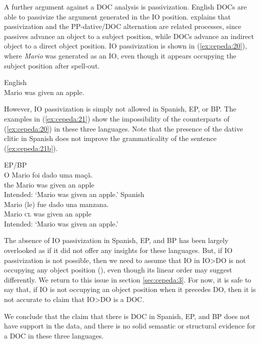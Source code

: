 \documentclass[output=paper,colorlinks,citecolor=brown,nonflat]{./langscibook}
\begin{document}
A further argument against a DOC analysis is passivization. English DOCs are able to passivize the argument generated in the IO position. \citet{Larson1988} explains that passivization and the PP-dative/DOC alternation are related processes, since passives advance an object to a subject position, while DOCs advance an indirect object to a direct object position. IO passivization is shown in (\ref{ex:cepeda:20}), where \textit{Mario} was generated as an IO, even though it appears occupying the subject position after spell-out.

\ea%
    \label{ex:cepeda:20} 
    English\\
	Mario was given an apple.
\z

However, IO passivization is simply not allowed in Spanish, EP, or BP. The examples in (\ref{ex:cepeda:21}) show the impossibility of the counterparts of (\ref{ex:cepeda:20}) in these three languages. Note that the presence of the dative clitic in Spanish does not improve the grammaticality of the sentence (\ref{ex:cepeda:21b}).

\ea%
    \label{ex:cepeda:21}
	\ea\label{ex:cepeda:21a}
	EP/BP\\
	\gll *O Mario  foi   dado uma maçã.\\
		the Mario was given an    apple\\
	\glt Intended: ‘Mario was given an apple.’
	\ex\label{ex:cepeda:21b}
	Spanish\\
	\gll  *Mario (le) fue dado  una manzana.\\
		Mario \textsc{cl} was given an apple\\
	\glt Intended: ‘Mario was given an apple.’
	\z
\z

The absence of IO passivization in Spanish, EP, and BP has been largely overlooked as if it did not offer any insights for these languages. But, if IO passivization is not possible, then we need to assume that IO in IO>DO is not occupying any object position (\citealt{Larson2014}), even though its linear order may suggest differently. We return to this issue in section \ref{sec:cepeda:3}. For now, it is safe to say that, if IO is not occupying an object position when it precedes DO, then it is not accurate to claim that IO>DO is a DOC.

We conclude that the claim that there is DOC in Spanish, EP, and BP does not have support in the data, and there is no solid semantic or structural evidence for a DOC in these three languages. 
\end{document}
